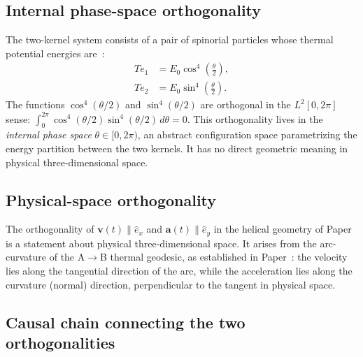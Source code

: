 \documentclass[%
 reprint, amsmath,amssymb, aps, prb, ]{revtex4-2}
\numberwithin{equation}{section}
\newcommand{\iphase}{\theta}
\newcommand{\ehat}[1]{\hat{e}_{#1}}
\begin{document}
\subsection{Internal phase-space orthogonality}
\label{subsec:internal_ortho}

The two-kernel system consists of a pair of spinorial particles whose thermal potential energies are~\cite{hanamura01}:
\begin{align}
Te_1 &= E_0\cos^4\!\!\left(\frac{\iphase}{2}\right), \label{eq:Te1}\\
Te_2 &= E_0\sin^4\!\!\left(\frac{\iphase}{2}\right). \label{eq:Te2}
\end{align}
The functions $\cos^4(\iphase/2)$ and $\sin^4(\iphase/2)$ are orthogonal in the $L^2[0,2\pi]$ sense: $\int_0^{2\pi}\cos^4(\iphase/2)\sin^4(\iphase/2)\,d\iphase = 0$. This orthogonality lives in the \emph{internal phase space} $\iphase \in [0, 2\pi)$, an abstract configuration space parametrizing the energy partition between the two kernels. It has no direct geometric meaning in physical three-dimensional space.

\subsection{Physical-space orthogonality}
\label{subsec:physical_ortho}

The orthogonality of $\mathbf{v}(t) \parallel \ehat{x}$ and $\mathbf{a}(t) \parallel \ehat{y}$ in the helical geometry of Paper~\cite{hanamura51} is a statement about physical three-dimensional space. It arises from the arc-curvature of the A$\to$B thermal geodesic, as established in Paper~\cite{hanamura49}: the velocity lies along the tangential direction of the arc, while the acceleration lies along the curvature (normal) direction, perpendicular to the tangent in physical space.

\subsection{Causal chain connecting the two orthogonalities}
\label{subsec:causal_chain}
\end{document}
